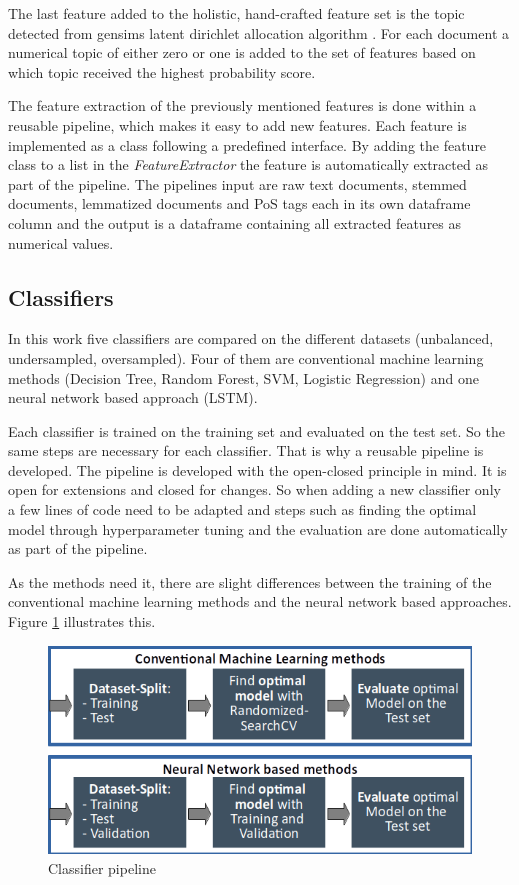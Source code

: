 The last feature added to the holistic, hand-crafted feature set is the topic detected from gensims latent dirichlet allocation algorithm \cite{Fortuna2018}. For each document a numerical topic of either zero or one is added to the set of features based on which topic received the highest probability score. 

The feature extraction of the previously mentioned features is done within a reusable pipeline, which makes it easy to add new features. Each feature is implemented as a class following a predefined interface. By adding the feature class to a list in the \textit{Feature\-Extractor} the feature is automatically extracted as part of the pipeline. The pipelines input are raw text documents, stemmed documents, lemmatized documents and PoS tags each in its own dataframe column and the output is a dataframe containing all extracted features as numerical values.

\subsection{Classifiers}
\label{ch:approachD}

In this work five classifiers are compared on the different datasets (unbalanced, undersampled, oversampled). Four of them are conventional machine learning methods (Decision Tree, Random Forest, SVM, Logistic Regression) and one neural network based approach (LSTM).

Each classifier is trained on the training set and evaluated on the test set. So the same steps are necessary for each classifier. That is why a reusable pipeline is developed. The pipeline is developed with the open-closed principle in mind. It is open for extensions and closed for changes. So when adding a new classifier only a few lines of code need to be adapted and steps such as finding the optimal model through hyperparameter tuning and the evaluation are done automatically as part of the pipeline.

As the methods need it, there are slight differences between the training of the conventional machine learning methods and the neural network based approaches. Figure \ref{fig:classifier_pipeline} illustrates this.

\begin{figure}[ht]
	\centering
	\includegraphics[width=0.7\linewidth]{figures/classifier_pipeline.png}
	\caption{Classifier pipeline}
	\label{fig:classifier_pipeline}
\end{figure}


